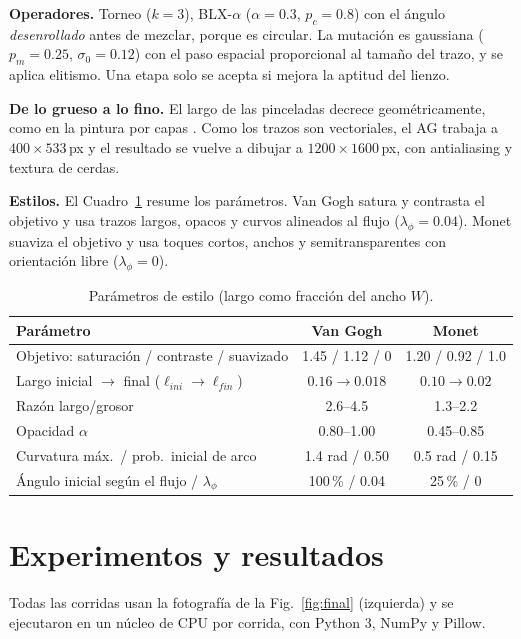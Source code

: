 \documentclass[10pt,letterpaper]{article}
\begin{document}
\textbf{Operadores.} Torneo ($k=3$), BLX-$\alpha$ ($\alpha=0.3$, $p_c=0.8$) con el ángulo \emph{desenrollado} antes de mezclar, porque es circular. La mutación es gaussiana ($p_m=0.25$, $\sigma_0=0.12$) con el paso espacial proporcional al tamaño del trazo, y se aplica elitismo. Una etapa solo se acepta si mejora la aptitud del lienzo.

\textbf{De lo grueso a lo fino.} El largo de las pinceladas decrece geométricamente, como en la pintura por capas \cite{hertzmann}. Como los trazos son vectoriales, el AG trabaja a $400\times533$\,px y el resultado se vuelve a dibujar a $1200\times1600$\,px, con antialiasing y textura de cerdas.

\textbf{Estilos.} El Cuadro~\ref{tab:estilos} resume los parámetros. Van Gogh satura y contrasta el objetivo y usa trazos largos, opacos y curvos alineados al flujo ($\lambda_\phi=0.04$). Monet suaviza el objetivo y usa toques cortos, anchos y semitransparentes con orientación libre ($\lambda_\phi=0$).

\begin{table}[h]
\centering\small
\caption{Parámetros de estilo (largo como fracción del ancho $W$).}
\label{tab:estilos}
\begin{tabular}{lcc}
\toprule
Parámetro & Van Gogh & Monet\\
\midrule
Objetivo: saturación / contraste / suavizado & 1.45 / 1.12 / 0 & 1.20 / 0.92 / 1.0\\
Largo inicial $\to$ final ($\ell_{ini}\to\ell_{fin}$) & $0.16\to0.018$ & $0.10\to0.02$\\
Razón largo/grosor & 2.6--4.5 & 1.3--2.2\\
Opacidad $\alpha$ & 0.80--1.00 & 0.45--0.85\\
Curvatura máx.\ / prob.\ inicial de arco & 1.4 rad / 0.50 & 0.5 rad / 0.15\\
Ángulo inicial según el flujo / $\lambda_\phi$ & 100\,\% / 0.04 & 25\,\% / 0\\
\bottomrule
\end{tabular}
\end{table}

\section{Experimentos y resultados}
Todas las corridas usan la fotografía de la Fig.~\ref{fig:final} (izquierda) y se ejecutaron en un núcleo de CPU por corrida, con Python 3, NumPy y Pillow.
\end{document}
